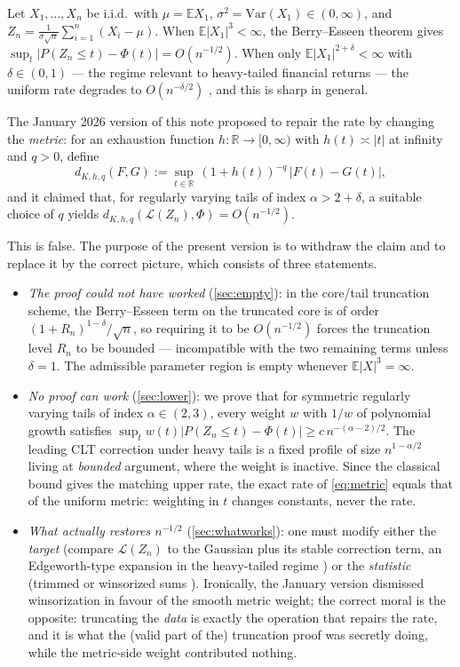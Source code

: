 \documentclass[11pt,a4paper]{article}
\theoremstyle{plain}
\theoremstyle{definition}
\theoremstyle{remark}
\numberwithin{equation}{section}
\newcommand{\R}{\mathbb{R}}
\newcommand{\E}{\mathbb{E}}
\newcommand{\Var}{\mathrm{Var}}
\newcommand{\1}{\mathbbm{1}}
\newcommand{\h}{h}
\begin{document}
Let $X_1,\dots,X_n$ be i.i.d.\ with $\mu=\E X_1$, $\sigma^2=\Var(X_1)\in(0,\infty)$, and
$Z_n=\frac{1}{\sigma\sqrt n}\sum_{i=1}^n(X_i-\mu)$. When $\E|X_1|^3<\infty$, the
Berry--Esseen theorem gives
$\sup_t|P(Z_n\le t)-\Phi(t)|=O(n^{-1/2})$. When only
$\E|X_1|^{2+\delta}<\infty$ with $\delta\in(0,1)$ --- the regime relevant to
heavy-tailed financial returns --- the uniform rate degrades to $O(n^{-\delta/2})$
\cite{Bikelis1966,Petrov1995}, and this is sharp in general.

The January 2026 version of this note proposed to repair the rate by changing the
\emph{metric}: for an exhaustion function $\h:\R\to[0,\infty)$ with $\h(t)\asymp|t|$ at
infinity and $q>0$, define
\begin{equation}\label{eq:metric}
d_{K,\h,q}(F,G):=\sup_{t\in\R}\,(1+\h(t))^{-q}\,|F(t)-G(t)|,
\end{equation}
and it claimed that, for regularly varying tails of index $\alpha>2+\delta$, a suitable
choice of $q$ yields $d_{K,\h,q}(\mathcal L(Z_n),\Phi)=O(n^{-1/2})$.

This is false. The purpose of the present version is to withdraw the claim and to
replace it by the correct picture, which consists of three statements.

\begin{itemize}
\item[(i)] \emph{The proof could not have worked} (\cref{sec:empty}): in the core/tail
truncation scheme, the Berry--Esseen term on the truncated core is of order
$(1+R_n)^{1-\delta}/\sqrt n$, so requiring it to be $O(n^{-1/2})$ forces the truncation
level $R_n$ to be bounded --- incompatible with the two remaining terms unless
$\delta=1$. The admissible parameter region is empty whenever $\E|X|^3=\infty$.
\item[(ii)] \emph{No proof can work} (\cref{sec:lower}): we prove that for symmetric
regularly varying tails of index $\alpha\in(2,3)$, every weight $w$ with $1/w$ of
polynomial growth satisfies
$\sup_t w(t)|P(Z_n\le t)-\Phi(t)|\ge c\,n^{-(\alpha-2)/2}$. The leading CLT correction
under heavy tails is a fixed profile of size $n^{1-\alpha/2}$ living at \emph{bounded}
argument, where the weight is inactive. Since the classical bound gives the matching
upper rate, the exact rate of \eqref{eq:metric} equals that of the uniform metric:
weighting in $t$ changes constants, never the rate.
\item[(iii)] \emph{What actually restores $n^{-1/2}$} (\cref{sec:whatworks}): one must
modify either the \emph{target} (compare $\mathcal L(Z_n)$ to the Gaussian plus its
stable correction term, an Edgeworth-type expansion in the heavy-tailed regime
\cite{IbragimovLinnik,ChristophWolf}) or the \emph{statistic} (trimmed or winsorized
sums \cite{CsorgoHaeuslerMason}). Ironically, the January version dismissed
winsorization in favour of the smooth metric weight; the correct moral is the opposite:
truncating the \emph{data} is exactly the operation that repairs the rate, and it is
what the (valid part of the) truncation proof was secretly doing, while the metric-side
weight contributed nothing.
\end{itemize}
\end{document}
